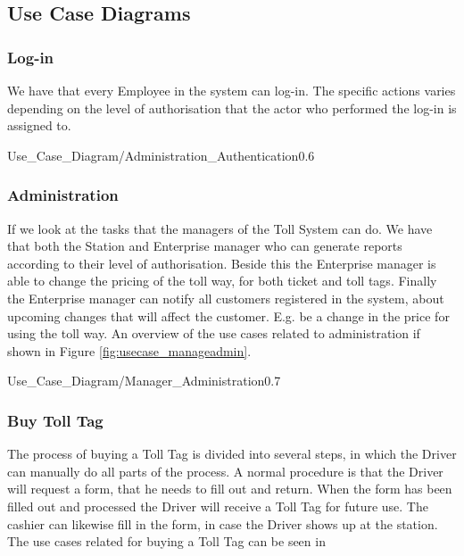 \subsection{Use Case Diagrams}
\label{subsec:usecasediagrams}
\subsubsection{Log-in}
\madeby{\af} {\jb}
We have that every Employee in the system can log-in. The specific actions varies depending on the level of authorisation that the actor who performed the log-in is assigned to. 

\begin{myfigure}{Use_Case_Diagram/Administration_Authentication}{0.6}
\caption{Log-in use case. \madeby{\mt}{\jb}}
\label{fig:usecase_login}
\end{myfigure}

\subsubsection{Administration}
\madeby{\mb}{\kj}
If we look at the tasks that the managers of the Toll System can do. We have that both the Station and Enterprise manager who can generate reports according to their level of authorisation. Beside this the Enterprise manager is able to change the pricing of the toll way, for both ticket and toll tags. Finally the Enterprise manager can notify all customers registered in the system, about upcoming changes that will affect the customer. E.g. be a change in the price for using the toll way. An overview of the use cases related to administration if shown in Figure \ref{fig:usecase_manageadmin}.

\begin{myfigure}{Use_Case_Diagram/Manager_Administration}{0.7}
\caption{Use cases related to the administration that managers can perform on the Toll System. \madeby{\jb}{\mb}}
\label{fig:usecase_manageadmin}
\end{myfigure}

\subsubsection{Buy Toll Tag}
\madeby{\kj}{\mt}
The process of buying a Toll Tag is divided into several steps, in which the Driver can manually do all parts of the process. A normal procedure is that the Driver will request a form, that he needs to fill out and return. When the form has been filled out and processed the Driver will receive a Toll Tag for future use. The cashier can likewise fill in the form, in case the Driver shows up at the station. The use cases related for buying a Toll Tag can be seen in 

